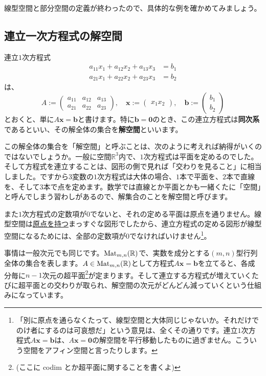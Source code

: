 線型空間と部分空間の定義が終わったので、具体的な例を確かめてみましょう。

\subsection{連立一次方程式の解空間}

連立$1$次方程式
\begin{align*}
a_{11} x_1 + a_{12} x_2 + a_{13} x_3 &= b_1 \\
a_{21} x_1 + a_{22} x_2 + a_{23} x_3 &= b_2
\end{align*}
は、
\[
A :=
\begin{pmatrix}
a_{11} & a_{12} & a_{13} \\
a_{21} & a_{22} & a_{23}
\end{pmatrix}, \quad
\bm{x} :=
\begin{pmatrix}
x_1
x_2
\end{pmatrix}, \quad
\bm{b} := 
\begin{pmatrix}
b_1 \\
b_2
\end{pmatrix}
\]
とおくと、単に$A\bm{x} = \bm{b}$と書けます。特に$\bm{b} = \bm{0}$のとき、この連立方程式は\textbf{同次系}であるといい、その解全体の集合を\textbf{解空間}といいます。

この解全体の集合を「解空間」と呼ぶことは、次のように考えれば納得がいくのではないでしょうか。一般に空間$\mathbb{R}^3$内で、$1$次方程式は平面を定めるのでした。そして方程式を連立することは、図形の側で見れば「交わりを見ること」に相当しました。ですから$3$変数の$1$次方程式は大体の場合、$1$本で平面を、$2$本で直線を、そして$3$本で点を定めます。数学では直線とか平面とかも一緒くたに「空間」と呼んでしまう習わしがあるので、解集合のことを解空間と呼びます。

また$1$次方程式の定数項が$0$でないと、それの定める平面は原点を通りません。線型空間は\uline{原点を持つ}まっすぐな図形でしたから、連立方程式の定める図形が線型空間になるためには、全部の定数項が$0$でなければいけません\footnote{「別に原点を通らなくたって、線型空間と大体同じじゃないか。それだけでのけ者にするのは可哀想だ」という意見は、全くその通りです。連立$1$次方程式$A\bm{x} = \bm{b}$は、$A\bm{x} = \bm{0}$の解空間を平行移動したものに過ぎません。こういう空間をアフィン空間と言ったりします。}。

事情は一般次元でも同じです。$\operatorname{Mat}_{m, n}(\mathbb{R})$で、実数を成分とする$(m,n)$型行列全体の集合を表します。$A\in\operatorname{Mat}_{m, n}(\mathbb{R})$として方程式$A\bm{x} = \bm{b}$を立てると、各成分毎に$n-1$次元の超平面\footnote{ (ここに codim とか超平面に関することを書くよ) }が定まります。そして連立する方程式が増えていくたびに超平面との交わりが取られ、解空間の次元がどんどん減っていくという仕組みになっています。

